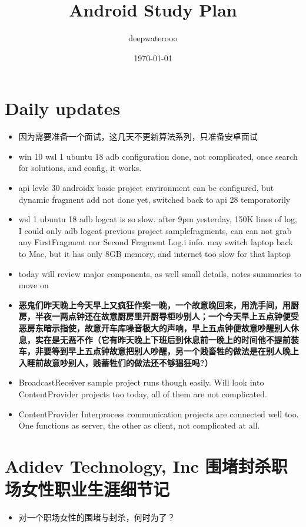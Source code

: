 \documentclass[9pt, b5paper]{article}
\author{deepwaterooo}
\date{\today}
\title{Android Study Plan}
\begin{document}
\maketitle
\tableofcontents


\section{Daily updates}
\label{sec-1}
\begin{itemize}
\item 因为需要准备一个面试，这几天不更新算法系列，只准备安卓面试
\item win 10 wsl 1 ubuntu 18 adb configuration done, not complicated, once search for solutions, and config, it works.
\item api levle 30 androidx basic project environment can be configured, but dynamic fragment add not done yet, switched back to api 28 temporatorily
\item wsl 1 ubuntu 18 adb logcat is so slow. after 9pm yesterday, 150K lines of log, I could only adb logcat previous project samplefragments, can can not grab any FirstFragment nor Second Fragment Log.i info. may switch laptop back to Mac, but it has only 8GB memory, and internet too slow for that laptop
\item today will review major components, as well small details, notes summaries to move on
\item \textbf{恶鬼们昨天晚上今天早上又疯狂作案一晚，一个故意晚回来，用洗手间，用厨房，半夜一两点钟还在故意厨房里开厨导柜吵别人；一个今天早上五点钟便受恶房东暗示指使，故意开车库噪音极大的声响，早上五点钟便故意吵醒别人休息，实在是无恶不作（它有昨天晚上下班后到休息前一晚上的时间他不提前装车，非要等到早上五点钟故意把别人吵醒，另一个贱畜牲的做法是在别人晚上入睡前故意吵别人，贱蓄牲们的做法还不够猖狂吗?）}
\item BroadcastReceiver sample project runs though easily. Will look into ContentProvider projects too today, all of them are not complicated.
\item ContentProvider Interprocess communication projects are connected well too. One functions as server, the other as client, not complicated at all.
\end{itemize}

\section{Adidev Technology, Inc 围堵封杀职场女性职业生涯细节记}
\label{sec-2}
\begin{itemize}
\item 对一个职场女性的围堵与封杀，何时为了？
\end{itemize}
\end{document}
